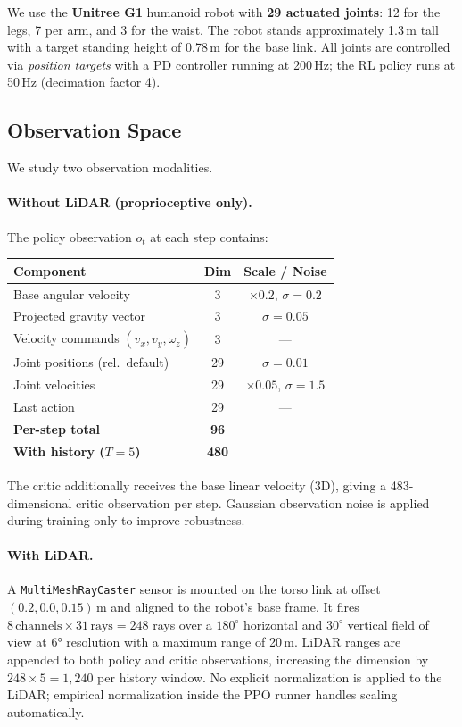 \documentclass{article}
\begin{document}
We use the \textbf{Unitree G1} humanoid robot with \textbf{29 actuated
joints}: 12 for the legs, 7 per arm, and 3 for the waist.
The robot stands approximately 1.3\,m tall with a target standing height of
0.78\,m for the base link.
All joints are controlled via \emph{position targets} with a PD controller
running at 200\,Hz; the RL policy runs at 50\,Hz (decimation factor 4).

\subsection{Observation Space}

We study two observation modalities.

\paragraph{Without LiDAR (proprioceptive only).}
The policy observation $o_t$ at each step contains:

\begin{center}
\begin{tabular}{lcc}
  \toprule
  \textbf{Component} & \textbf{Dim} & \textbf{Scale / Noise} \\
  \midrule
  Base angular velocity & 3 & $\times 0.2$, $\sigma{=}0.2$ \\
  Projected gravity vector & 3 & $\sigma{=}0.05$ \\
  Velocity commands $(v_x, v_y, \omega_z)$ & 3 & --- \\
  Joint positions (rel.\ default) & 29 & $\sigma{=}0.01$ \\
  Joint velocities & 29 & $\times 0.05$, $\sigma{=}1.5$ \\
  Last action & 29 & --- \\
  \midrule
  \textbf{Per-step total} & \textbf{96} & \\
  \textbf{With history ($T{=}5$)} & \textbf{480} & \\
  \bottomrule
\end{tabular}
\end{center}

The critic additionally receives the base linear velocity (3D), giving a
483-dimensional critic observation per step.
Gaussian observation noise is applied during training only to improve
robustness.

\paragraph{With LiDAR.}
A \texttt{MultiMeshRayCaster} sensor is mounted on the torso link at offset
$(0.2, 0.0, 0.15)$\,m and aligned to the robot's base frame.
It fires $8\,\text{channels} \times 31\,\text{rays} = 248$ rays over a
$180^\circ$ horizontal and $30^\circ$ vertical field of view at 6° resolution
with a maximum range of 20\,m.
LiDAR ranges are appended to both policy and critic observations, increasing
the dimension by $248 \times 5 = 1{,}240$ per history window.
No explicit normalization is applied to the LiDAR; empirical normalization
inside the PPO runner handles scaling automatically.
\end{document}
